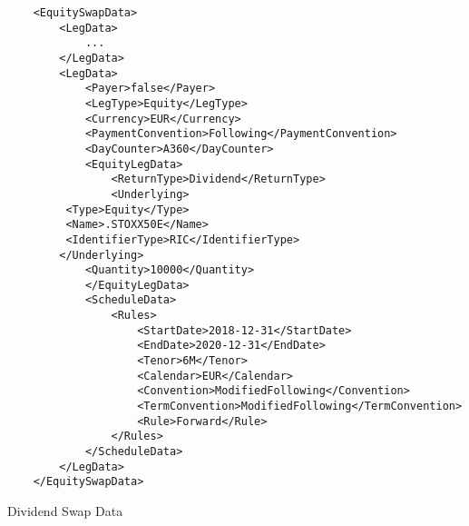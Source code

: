 \begin{listing}[H]
\begin{verbatim}
    <EquitySwapData>
        <LegData>
            ...
        </LegData>
        <LegData>
            <Payer>false</Payer>
            <LegType>Equity</LegType>
            <Currency>EUR</Currency>
            <PaymentConvention>Following</PaymentConvention>
            <DayCounter>A360</DayCounter>
            <EquityLegData>
                <ReturnType>Dividend</ReturnType>
                <Underlying>
		 <Type>Equity</Type>
		 <Name>.STOXX50E</Name>
		 <IdentifierType>RIC</IdentifierType>
		</Underlying>
	        <Quantity>10000</Quantity>
            </EquityLegData>
            <ScheduleData>
                <Rules>
                    <StartDate>2018-12-31</StartDate>
                    <EndDate>2020-12-31</EndDate>
                    <Tenor>6M</Tenor>
                    <Calendar>EUR</Calendar>
                    <Convention>ModifiedFollowing</Convention>
                    <TermConvention>ModifiedFollowing</TermConvention>
                    <Rule>Forward</Rule>
                </Rules>
            </ScheduleData>
        </LegData>
    </EquitySwapData>
\end{verbatim}
\caption{Dividend Swap Data}
\label{lst:dividendswap}
\end{listing}